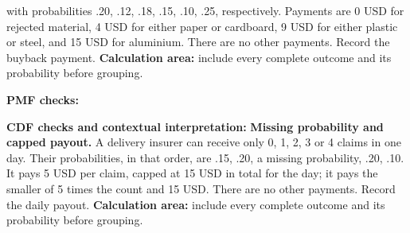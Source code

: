 with probabilities .20, .12, .18, .15, .10, .25, respectively. Payments are 0 USD for rejected material, 4 USD
for either paper or cardboard, 9 USD for either plastic or steel, and 15 USD for aluminium. There are no other
payments. Record the buyback payment.
\textbf{Calculation area:} include every complete outcome and its probability before grouping.
\par%
\noindent%
\begin{minipage}[t]{.37\linewidth}%
\vspace{0pt}\centering
{}%
\end{minipage}%
\hfill%
\begin{minipage}[t]{.60\linewidth}%
\vspace{0pt}\centering
{}
\end{minipage}%
\par
\textbf{PMF checks:} \hrulefill%
\par
{}
\par%
\noindent%
\begin{minipage}[t]{.37\linewidth}%
\vspace{0pt}\centering
{}%
\end{minipage}%
\hfill%
\begin{minipage}[t]{.60\linewidth}%
\vspace{0pt}\centering
{}
\end{minipage}%
\par
\textbf{CDF checks and contextual interpretation:}
\vfill
\clearpage
{}
\textbf{Missing probability and capped payout.} A delivery insurer can receive only 0, 1, 2, 3 or 4 claims in
one day. Their probabilities, in that order, are .15, .20, a missing probability, .20, .10. It pays 5 USD per
claim, capped at 15 USD in total for the day; it pays the smaller of 5 times the count and 15 USD. There are
no other payments. Record the daily payout.
\textbf{Calculation area:} include every complete outcome and its probability before grouping.
